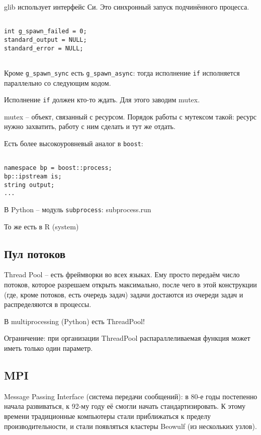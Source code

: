 \documentclass[main.tex]{subfiles}
\begin{document}
	glib использует интерфейс Си.
	Это синхронный запуск подчинённого процесса.

\begin{verbatim}

int g_spawn_failed = 0;
standard_output = NULL;
standard_error = NULL;
	
\end{verbatim}

Кроме \texttt{g\_spawn\_sync} есть \texttt{g\_spawn\_async}:
тогда исполнение \texttt{if} исполняется параллельно со следующим кодом.

Исполнение \texttt{if} должен кто-то ждать.
Для этого заводим mutex.

\begin{leftbar}
	mutex -- объект, связанный с ресурсом.
	Порядок работы с мутексом такой: ресурс нужно захватить, работу с ним сделать и тут же отдать.
\end{leftbar}


Есть более высокоуровневый аналог в \texttt{boost}:

\begin{verbatim}

namespace bp = boost::process;
bp::ipstream is;
string output;
...

\end{verbatim}

В Python -- модуль \texttt{subprocess}: subprocess.run

То же есть в R (system)

\subsection{Пул потоков}

Thread Pool -- есть фреймворки во всех языках.
Ему просто передаём число потоков, которое разрешаем открыть максимально, после чего в этой конструкции (где, кроме потоков, есть очередь задач) задачи достаются из очереди задач и распределяются в процессы.

В multiprocessing (Python) есть ThreadPool!

Ограничение: при организации ThreadPool распараллеливаемая функция может иметь только один параметр.

\subsection{MPI}

Message Passing Interface (система передачи сообщений): в 80-е годы постепенно начала развиваться, к 92-му году её смогли начать стандартизировать.
К этому времени традиционные компьютеры стали приближаться к пределу производительности, и стали появляться кластеры Beowulf (из нескольких узлов). \\
\end{document}
